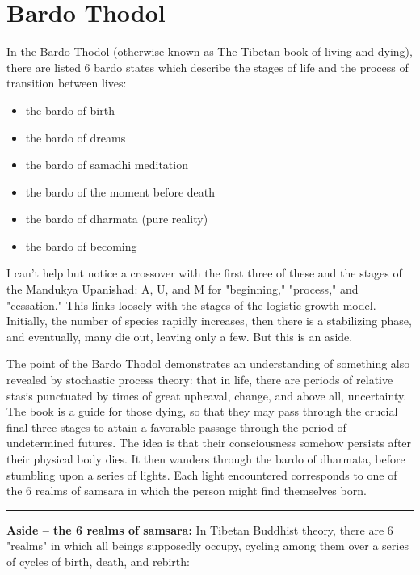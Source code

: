 \section*{Bardo Thodol}

 In the Bardo Thodol (otherwise known as The Tibetan book of living and dying), there are listed 6 bardo states which describe the stages of life and the process of transition between lives:

\begin{itemize} \item the bardo of birth \item the bardo of dreams \item the bardo of samadhi meditation \item the bardo of the moment before death \item the bardo of dharmata (pure reality) \item the bardo of becoming \end{itemize}

I can't help but notice a crossover with the first three of these and the stages of the Mandukya Upanishad: A, U, and M for "beginning," "process," and "cessation." This links loosely with the stages of the logistic growth model. Initially, the number of species rapidly increases, then there is a stabilizing phase, and eventually, many die out, leaving only a few. But this is an aside.

The point of the Bardo Thodol demonstrates an understanding of something also revealed by stochastic process theory: that in life, there are periods of relative stasis punctuated by times of great upheaval, change, and above all, uncertainty. The book is a guide for those dying, so that they may pass through the crucial final three stages to attain a favorable passage through the period of undetermined futures. The idea is that their consciousness somehow persists after their physical body dies. It then wanders through the bardo of dharmata, before stumbling upon a series of lights. Each light encountered corresponds to one of the 6 realms of samsara in which the person might find themselves born.

\vspace{5pt} \hrule \vspace{5pt}

\noindent \textbf{Aside -- the 6 realms of samsara: } In Tibetan Buddhist theory, there are 6 "realms" in which all beings supposedly occupy, cycling among them over a series of cycles of birth, death, and rebirth:

